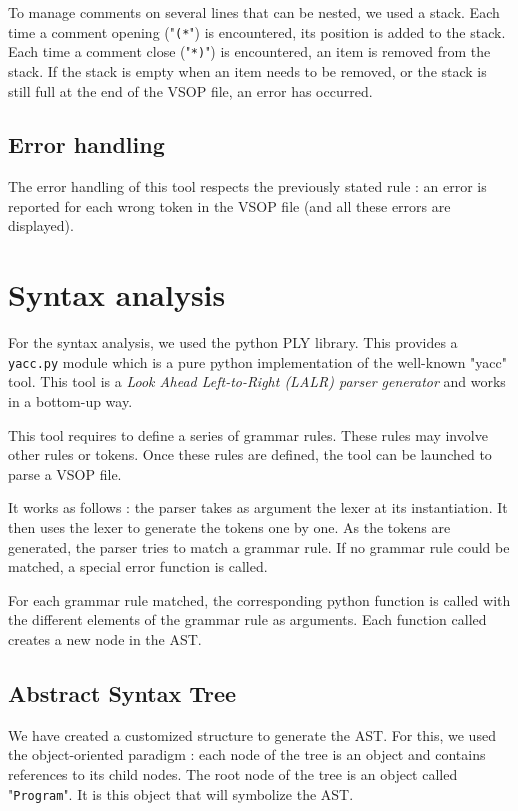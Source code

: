 \documentclass[a4paper, 12pt]{article}
\begin{document}
    To manage comments on several lines that can be nested, we used a stack. Each time a comment opening ("\texttt{(*}") is encountered, its position is added to the stack. Each time a comment close ("\texttt{*)}") is encountered, an item is removed from the stack. If the stack is empty when an item needs to be removed, or the stack is still full at the end of the VSOP file, an error has occurred.
    
    \subsection{Error handling}
    
    The error handling of this tool respects the previously stated rule : an error is reported for each wrong token in the VSOP file (and all these errors are displayed).
    
    
    \section{Syntax analysis}
    
    For the syntax analysis, we used the python PLY library. This provides a \texttt{yacc.py} module which is a pure python implementation of the well-known "yacc" tool. This tool is a {\it Look Ahead Left-to-Right (LALR) parser generator} and works in a bottom-up way.
    
    This tool requires to define a series of grammar rules. These rules may involve other rules or tokens. Once these rules are defined, the tool can be launched to parse a VSOP file.
    
    It works as follows : the parser takes as argument the lexer at its instantiation. It then uses the lexer to generate the tokens one by one. As the tokens are generated, the parser tries to match a grammar rule. If no grammar rule could be matched, a special error function is called.
    
    For each grammar rule matched, the corresponding python function is called with the different elements of the grammar rule as arguments. Each function called creates a new node in the AST.
    
    \subsection{Abstract Syntax Tree}
    
    We have created a customized structure to generate the AST. For this, we used the object-oriented paradigm : each node of the tree is an object and contains references to its child nodes. The root node of the tree is an object called "\texttt{Program}". It is this object that will symbolize the AST.
    
\end{document}
